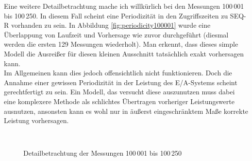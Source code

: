 \documentclass[
	twoside,
	12pt,
	a4paper,
	BCOR10mm,
	DIV14,
	listof=totoc,
	bibliography=totoc,
	headsepline
]{scrreprt}
\begin{document}
Eine weitere Detailbetrachtung mache ich willkürlich bei den Messungen 100\,001 bis 100\,250.
In diesem Fall scheint eine Periodizität in den Zugriffszeiten zu SEQ-R vorhanden zu sein. In Abbildung \ref{fig:periodicity100001} wurde eine Überlappung von Laufzeit und Vorhersage wie zuvor durchgeführt (diesmal werden die ersten 129 Messungen wiederholt). Man erkennt, dass dieses simple Modell die Ausreißer für diesen kleinen Ausschnitt tatsächlich exakt vorhersagen kann.\\
Im Allgemeinen kann dies jedoch offensichtlich nicht funktionieren.
Doch die Annahme einer gewissen Periodizität in der Leistung des E/A-Systems scheint gerechtfertigt zu sein.
Ein Modell, das versucht diese auszunutzen muss dabei eine komplexere Methode als schlichtes Übertragen vorheriger Leistungswerte ausnutzen, ansonsten kann es wohl nur in äußerst eingeschränktem Maße korrekte Leistung vorhersagen.

\begin{figure}
	\centering
	\hfill
	\\
	\hfill
	\caption{Detailbetrachtung der Messungen 100\,001 bis 100\,250}
	\label{fig:from100001}
\end{figure} 
\end{document}
